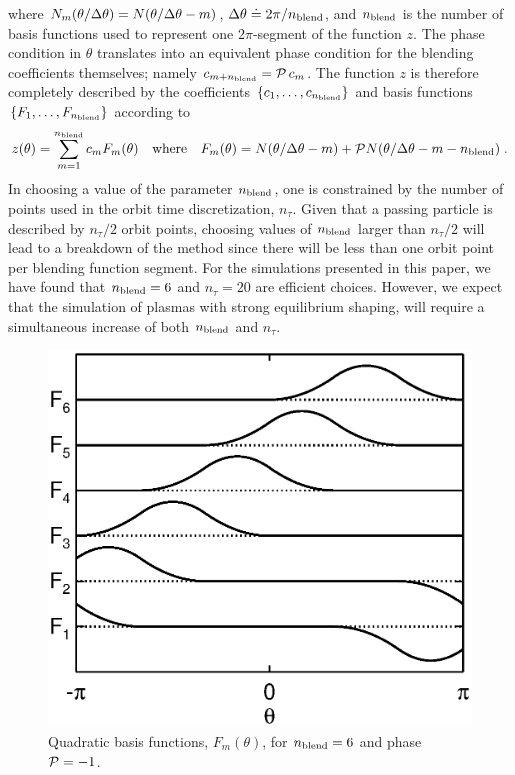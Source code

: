 \noindent
where $N_m(\theta/\Delta\theta) = N(\theta/\Delta\theta - m)$, 
$\Delta\theta \doteq 2\pi/{n_{\rm blend}}$, and ${n_{\rm blend}}$ is the number of basis 
functions used to represent one $2\pi$-segment of the 
function $z$.  The phase condition in $\theta$ translates into an 
equivalent phase condition for the blending coefficients 
themselves; namely 
$c_{m+{n_{\rm blend}}} = {\cal P} \, c_m$.  The function $z$ 
is therefore completely described by the coefficients 
$\left\{c_1, \ldots, c_{n_{\rm blend}}\right\}$ and basis functions 
$\left\{F_1, \ldots, F_{n_{\rm blend}}\right\}$ according to
%
\begin{equation}
z(\theta) = \sum_{m=1}^{n_{\rm blend}} c_m F_m(\theta)
\quad\hbox{where}\quad
F_m (\theta) = N(\theta/\Delta\theta-m) + {\cal P} N(\theta/\Delta\theta-m-{n_{\rm blend}}) \; .
\label{blendf}
\end{equation}
%
In choosing a value of the parameter ${n_{\rm blend}}$, 
one is constrained by the number of points used in the 
orbit time discretization, $n_\tau$.  Given that a passing 
particle is described by $n_\tau/2$ orbit points, choosing 
values of ${n_{\rm blend}}$ larger than $n_\tau/2$ will lead to a 
breakdown of the method since there will be less than 
one orbit point per blending function segment.  For the 
simulations presented in this paper, we have found that 
${n_{\rm blend}}=6$ and $n_\tau=20$ are efficient choices.  However, we 
expect that the simulation of plasmas with strong equilibrium 
shaping, will require a simultaneous increase of both 
${n_{\rm blend}}$ and $n_\tau$.  

\begin{figure}
\begin{center}
\includegraphics[scale=0.65]{figures/blend_f.ps}
\end{center}
\caption{Quadratic basis functions, $F_m (\theta)$, for 
${n_{\rm blend}}=6$ and phase ${\cal P}=-1$.}
\label{fig.blendf}
\end{figure}

